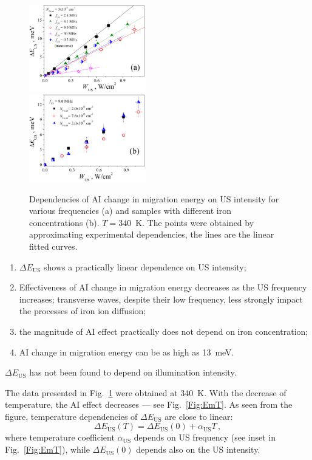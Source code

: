 \documentclass[%
 aip,jap,
 amsmath,amssymb,
 reprint,%
]{revtex4-1}
\begin{document}
\begin{figure}
\includegraphics[width=0.45\textwidth]{Fig5a}\\%
\includegraphics[width=0.45\textwidth]{Fig5b}%
\caption{\label{Fig:EmWus}
Dependencies of AI change in migration energy on US intensity for various
frequencies (a) and samples with different  iron concentrations (b).
$T=340$~K.
The points were obtained by approximating experimental dependencies,
the lines are the linear fitted curves.
}
\end{figure}


\begin{enumerate}
  \item $\Delta E_\mathrm{US}$ shows a practically linear dependence on US intensity;
  \item Effectiveness of AI change in migration energy decreases as the US frequency increases; transverse waves, despite their low frequency, less strongly impact the processes of iron ion diffusion;
  \item the magnitude of AI effect practically does not depend on iron concentration;
  \item AI change in migration energy can be as high as 13~meV.
\end{enumerate}

$\Delta E_\mathrm{US}$ has not been found to depend on illumination intensity.

The data presented in Fig.~\ref{Fig:EmWus} were obtained at 340~K.
With the decrease of temperature, the AI effect  decreases –-- see Fig.~\ref{Fig:EmT}.
As seen from the figure, temperature dependencies of $\Delta E_\mathrm{US}$ are close to linear:
\begin{equation}
\label{eqEmT}
\Delta E_\mathrm{US}(T)=\Delta E_\mathrm{US}(0)+\alpha_\mathrm{US}T\,,
\end{equation}
where temperature coefficient $\alpha_\mathrm{US}$ depends on US frequency
(see inset in Fig.~\ref{Fig:EmT}), while $\Delta E_\mathrm{US}(0)$ depends also on the US intensity.
\end{document}
